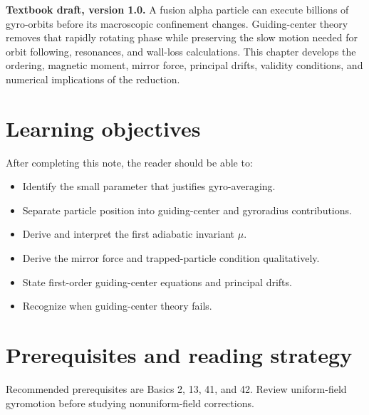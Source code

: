 \documentclass[11pt]{article}
\begin{document}

\begin{overviewbox}
\textbf{Textbook draft, version 1.0.} A fusion alpha particle can execute billions of gyro-orbits before its macroscopic confinement changes. Guiding-center theory removes that rapidly rotating phase while preserving the slow motion needed for orbit following, resonances, and wall-loss calculations. This chapter develops the ordering, magnetic moment, mirror force, principal drifts, validity conditions, and numerical implications of the reduction.
\end{overviewbox}

\ProjectTOC

\section{Learning objectives}
After completing this note, the reader should be able to:
\begin{itemize}[leftmargin=1.6em]
\item Identify the small parameter that justifies gyro-averaging.
\item Separate particle position into guiding-center and gyroradius contributions.
\item Derive and interpret the first adiabatic invariant $\mu$.
\item Derive the mirror force and trapped-particle condition qualitatively.
\item State first-order guiding-center equations and principal drifts.
\item Recognize when guiding-center theory fails.
\end{itemize}

\section{Prerequisites and reading strategy}
Recommended prerequisites are Basics 2, 13, 41, and 42. Review uniform-field gyromotion before studying nonuniform-field corrections.
\end{document}
